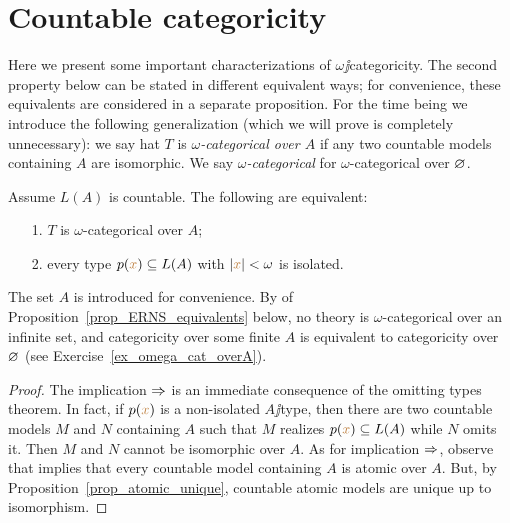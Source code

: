 \documentclass[creche.tex]{subfiles}
\begin{document}
\section{Countable categoricity}

Here we present some important characterizations of $\omega\jj$categoricity.
The second property below can be stated in different equivalent ways; for convenience, these equivalents are considered in a separate proposition.
For the time being we introduce the following generalization (which we will prove is completely unnecessary): we say hat $T$ is \emph{$\omega$-categorical over $A$\/} if any two countable models containing $A$ are isomorphic.
We say \emph{$\omega$-categorical\/} for $\omega$-categorical over $\varnothing$.

\begin{theorem} Assume $L(A)$ is countable.
The following are equivalent:
\begin{itemize}   
\item[1.] $T$ is $\omega$-categorical over $A$;
\item[2.] every type $p({\color{brown} x})\subseteq L(A)$ with $|{\color{brown} x}|<\omega$ is isolated.

\end{itemize}
\end{theorem}
The set $A$ is introduced for convenience.
By  of Proposition~\ref{prop_ERNS_equivalents} below, no theory is $\omega$-categorical over an infinite set, and categoricity over some finite $A$ is equivalent to categoricity over $\varnothing$ (see Exercise~\ref{ex_omega_cat_overA}).

\begin{proof} The implication $\Rightarrow$ is an immediate consequence of the omitting types theorem.
In fact, if $p({\color{brown} x})$ is a non-isolated $A\jj$type, then there are two countable models $M$ and $N$ containing $A$ such that $M$ realizes $p({\color{brown} x})\subseteq L(A)$ while $N$ omits it.
Then $M$ and $N$ cannot be isomorphic over $A$.
As for implication $\Rightarrow$, observe that  implies that every countable model containing $A$ is atomic over $A$.
But, by Proposition~\ref{prop_atomic_unique}, countable atomic models are unique up to isomorphism.
\end{proof}
\end{document}
